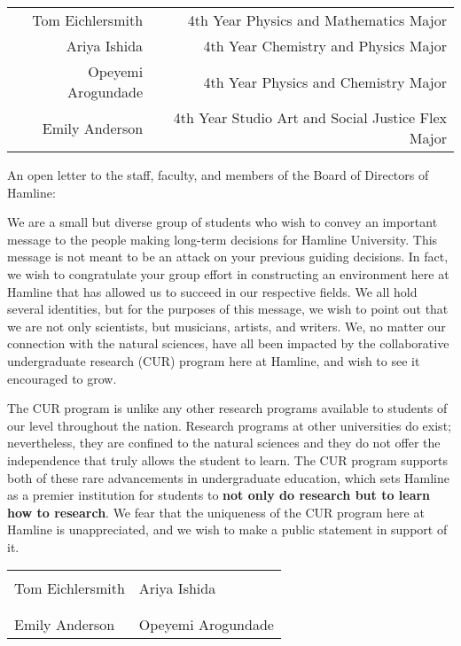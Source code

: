 \documentclass{article}
\makeatletter
\newcommand{\signers}{
	\begin{table}[h]
	\raggedleft
	\begin{tabular}{rr}
		Tom Eichlersmith & 4th Year Physics and Mathematics Major \\
		Ariya Ishida & 4th Year Chemistry and Physics Major \\
		Opeyemi Arogundade & 4th Year Physics and Chemistry Major \\
		Emily Anderson & 4th Year Studio Art and Social Justice Flex Major
	\end{tabular}
	\end{table}
}
\newcommand{\opening}{
	\vskip 5mm
	\noindent
	An open letter to the staff, faculty, and members of the Board of Directors of Hamline:
	\vskip 5mm
}
\newcommand{\signatures}{
	\vskip 5mm
	\begin{table}
	\begin{tabular}{@{}p{0.5\textwidth}p{0.5\textwidth}@{}}
		\hrulefill & \hrulefill \\
		Tom Eichlersmith & Ariya Ishida \\
		& \\
		\hrulefill & \hrulefill \\
		Emily Anderson & Opeyemi Arogundade  \\
	\end{tabular}
	\end{table}
}
\makeatother
\begin{document}
\onehalfspacing

\signers

\opening

We are a small but diverse group of students who wish to convey an important message to the people making long-term decisions for Hamline University.
This message is not meant to be an attack on your previous guiding decisions.
In fact, we wish to congratulate your group effort in constructing an environment here at Hamline that has allowed us to succeed in our respective fields.
We all hold several identities, but for the purposes of this message, we wish to point out that we are not only scientists, but musicians, artists, and writers.
We, no matter our connection with the natural sciences, have all been impacted by the collaborative undergraduate research (CUR) program here at Hamline, and wish to see it encouraged to grow.

The CUR program is unlike any other research programs available to students of our level throughout the nation.
Research programs at other universities do exist; nevertheless, they are confined to the natural sciences and they do not offer the independence that truly allows the student to learn.
The CUR program supports both of these rare advancements in undergraduate education, which sets Hamline as a premier institution for students to \textbf{not only do research but to learn how to research}.
We fear that the uniqueness of the CUR program here at Hamline is unappreciated, and we wish to make a public statement in support of it.


\signatures
\end{document}

